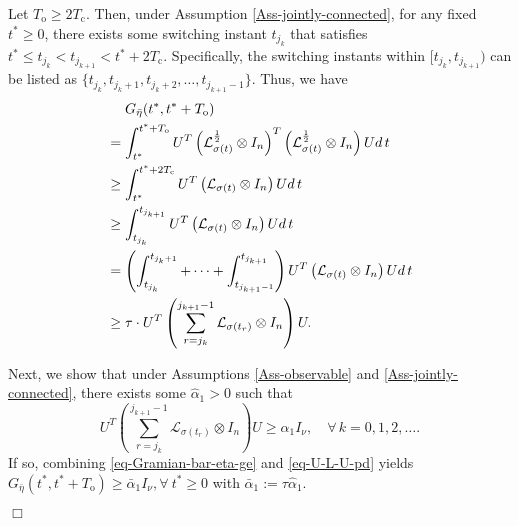 \documentclass[twocolumn]{autart}
\newenvironment{Proof}{\noindent{\em Proof:\/}}{\hfill $\Box$\par}
\begin{document}
\begin{Proof}
  Let $T_{\text{o}}\ge 2T_{\text{c}}$.
Then, under Assumption \ref{Ass-jointly-connected},  for any fixed $t^{*}\ge 0$,
there exists some switching instant $t_{j_{k}}$ that satisfies
$
    t^{*} \le t_{j_{k}} < t_{j_{k+1}} < t^{*} +2 T_{\text{c}}.
$
Specifically, the switching instants within $[t_{j_{k}}, t_{j_{k+1}})$ can be listed as
$\{t_{j_{k}}, t_{j_{k}+1}, t_{j_{k}+2}, \ldots, t_{j_{k+1}-1}\}$.
Thus, we have
\begin{align}\label{eq-Gramian-bar-eta-ge}
  &\quad\  G_{\bar{\eta}}(t^{*},t^{*}+T_{\text{o}})  \notag \\
  &=\int_{t^{*}}^{t^{*}+T_{\text{o}}} U^{T}\left(\mathcal{L}^{\frac{1}{2}}_{\sigma(t)}\otimes I_{n} \right)^{T}\left(\mathcal{L}^{\frac{1}{2}}_{\sigma(t)}\otimes I_{n}\right)U  d\, t \notag \\
  & \ge\int_{t^{*}}^{t^{*}+2 T_{\text{c}}}U^{T}\left(\mathcal{L}_{\sigma(t)}\otimes I_{n} \right)U  d\, t  \notag \\
  &\ge \int_{t_{j_{k}}}^{t_{j_{k+1}}} U^{T}\left(\mathcal{L}_{\sigma(t)}\otimes I_{n} \right)U d\, t  \notag \\
  &= \left(\int_{t_{j_{k}}}^{t_{j_{k}+1}}+\cdots+\int_{t_{j_{k+1}-1}}^{t_{j_{k+1}}}\right)
U^{T}\left(\mathcal{L}_{\sigma(t)}\otimes I_{n} \right)U d\, t \notag\\
& \ge \tau \cdot U^{T}\left(\sum_{r=j_{k}}^{j_{k+1}-1}\mathcal{L}_{\sigma(t_{r})}\otimes I_{n} \right)U .
\end{align}

Next, we show that under Assumptions \ref{Ass-observable} and \ref{Ass-jointly-connected},
there exists some $\hat{\alpha}_{1}>0$ such that
  \begin{equation}\label{eq-U-L-U-pd}
    U^{T}\left(\sum_{r=j_{k}}^{j_{k+1}-1}\mathcal{L}_{\sigma(t_{r})}\otimes I_{n} \right)U \ge \hat{\alpha}_{1} I_{\nu},
    \quad    \forall \, k=0,1,2,\ldots.
  \end{equation}
If so, combining \eqref{eq-Gramian-bar-eta-ge} and \eqref{eq-U-L-U-pd} yields
$ G_{\bar{\eta}}(t^{*},t^{*}+T_{\text{o}}) \ge \bar{\alpha}_{1}I_{\nu}, \forall\ t^{*}\ge 0$
with $\bar{\alpha}_{1}:=\tau \hat{\alpha}_{1}$.



\end{Proof}
\end{document}
